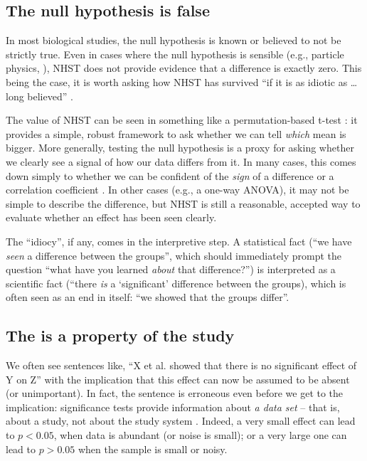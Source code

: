 \subsection*{The null hypothesis is false}

\noindent In most biological studies, the null hypothesis is known or believed to not be strictly true. Even in cases where the null hypothesis is sensible (e.g., particle physics, \cite{Staley2017}), NHST does not provide evidence that a difference is exactly zero. This being the case, it is worth asking how NHST has survived ``if it is as idiotic as \ldots long believed'' \citet[cited in \cite{Kramer2011}]{ZiliakandMcCloskey2008}.

The value of NHST can be seen in something like a permutation-based t-test \cite[Chapter 1]{GoodBook}: it provides a simple, robust framework to ask whether we can tell \emph{which} mean is bigger. More generally, testing the null hypothesis is a proxy for asking whether we clearly see a signal of how our data differs from it. In many cases, this comes down simply to whether we can be confident of the \emph{sign} of a difference or a correlation coefficient \citep{robinson2001past}. In other cases (e.g., a one-way ANOVA), it may not be simple to describe the difference, but NHST is still a reasonable, accepted way to evaluate whether an effect has been seen clearly.

The ``idiocy'', if any, comes in the interpretive step. A statistical fact (``we have \emph{seen} a difference between the groups'', which should immediately prompt the question ``what have you learned \emph{about} that difference?'') is interpreted as a scientific fact (``there \emph{is} a `significant' difference between the groups), which is often seen as an end in itself: ``we showed that the groups differ''.

\subsection*{The \pval is a property of the study}

\noindent We often see sentences like, ``X et al. showed that there is no significant effect of Y on Z'' with the implication that this effect can now be assumed to be absent (or unimportant). In fact, the sentence is erroneous even before we get to the implication: significance tests provide information about \emph{a data set} -- that is, about a study, not about the study system \citep{HoenigandHeisey2001}. Indeed, a very small effect can lead to $p < 0.05$, when data is abundant (or noise is small); or a very large one can lead to $p > 0.05$ when the sample is small or noisy. 


